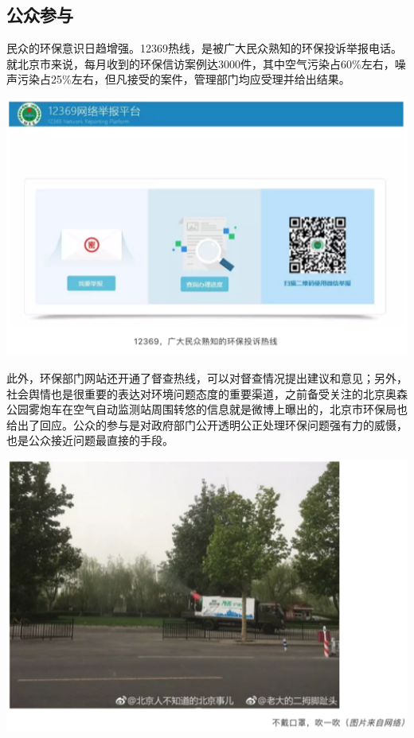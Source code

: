\documentclass[]{book}
\begin{document}
\subsection{公众参与}

民众的环保意识日趋增强。12369热线，是被广大民众熟知的环保投诉举报电话。就北京市来说，每月收到的环保信访案例达3000件，其中空气污染占60\%左右，噪声污染占25\%左右，但凡接受的案件，管理部门均应受理并给出结果。

\includegraphics[width=6.67in]{images/fw5}

此外，环保部门网站还开通了督查热线，可以对督查情况提出建议和意见；另外，社会舆情也是很重要的表达对环境问题态度的重要渠道，之前备受关注的北京奥森公园雾炮车在空气自动监测站周围转悠的信息就是微博上曝出的，北京市环保局也给出了回应。公众的参与是对政府部门公开透明公正处理环保问题强有力的威慑，也是公众接近问题最直接的手段。

\includegraphics[width=6.67in]{images/fw6}
\end{document}
